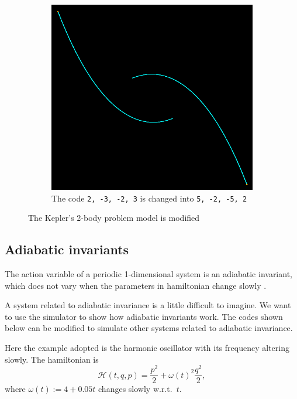 \documentclass[12pt]{article}
\begin{document}
\begin{figure}[h]
\begin{subfigure}[b]{0.6\linewidth}
    \includegraphics[width=\linewidth]{distortion3_kepler.png}
    \caption{The code \texttt{2, -3, -2, 3} is changed into \texttt{5, -2, -5, 2}}
  \end{subfigure}
  \caption{The Kepler's 2-body problem model is modified}
  \label{fig:distortion_kepler}
\end{figure}

\subsection{Adiabatic invariants}

The action variable of a periodic 1-dimensional system is an adiabatic invariant,
which does not vary when the parameters in hamiltonian change slowly \cite[p. 298]{arnold1989mathmech}\cite[p. 156]{landau1976mechanics}.

A system related to adiabatic invariance is a little difficult to imagine.
We want to use the simulator to show how adiabatic invariants work.
The codes shown below can be modified to simulate other systems related to adiabatic invariance.

Here the example adopted is the harmonic oscillator with its frequency altering slowly.
The hamiltonian is
\begin{equation*}
  \mathcal H\left(t,q,p\right)=\frac{p^2}2+\omega\!\left(t\right)^2\frac{q^2}2,
\end{equation*}
where $\omega\!\left(t\right):=4+0.05t$ changes slowly w.r.t.\ $t$.
\end{document}
